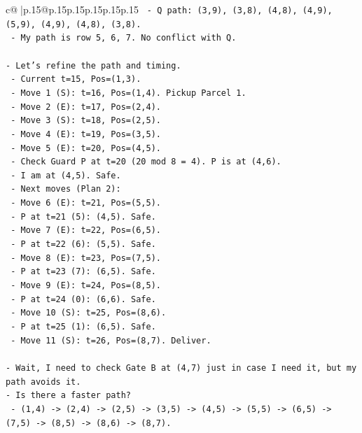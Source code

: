 \documentclass{article}
\begin{document}
{\begin{supertabular}{c@{$\;$}|p{.15\linewidth}@{}p{.15\linewidth}p{.15\linewidth}p{.15\linewidth}p{.15\linewidth}p{.15\linewidth}}
{{{\texttt{          {-} Q path: (3,9), (3,8), (4,8), (4,9), (5,9), (4,9), (4,8), (3,8).} \\
\texttt{          {-} My path is row 5, 6, 7. No conflict with Q.} \\
\\ 
\texttt{{-} Let's refine the path and timing.} \\
\texttt{  {-} Current t=15, Pos=(1,3).} \\
\texttt{  {-} Move 1 (S): t=16, Pos=(1,4). Pickup Parcel 1.} \\
\texttt{  {-} Move 2 (E): t=17, Pos=(2,4).} \\
\texttt{  {-} Move 3 (S): t=18, Pos=(2,5).} \\
\texttt{  {-} Move 4 (E): t=19, Pos=(3,5).} \\
\texttt{  {-} Move 5 (E): t=20, Pos=(4,5).} \\
\texttt{    {-} Check Guard P at t=20 (20 mod 8 = 4). P is at (4,6).} \\
\texttt{    {-} I am at (4,5). Safe.} \\
\texttt{  {-} Next moves (Plan 2):} \\
\texttt{    {-} Move 6 (E): t=21, Pos=(5,5).} \\
\texttt{      {-} P at t=21 (5): (4,5). Safe.} \\
\texttt{    {-} Move 7 (E): t=22, Pos=(6,5).} \\
\texttt{      {-} P at t=22 (6): (5,5). Safe.} \\
\texttt{    {-} Move 8 (E): t=23, Pos=(7,5).} \\
\texttt{      {-} P at t=23 (7): (6,5). Safe.} \\
\texttt{    {-} Move 9 (E): t=24, Pos=(8,5).} \\
\texttt{      {-} P at t=24 (0): (6,6). Safe.} \\
\texttt{    {-} Move 10 (S): t=25, Pos=(8,6).} \\
\texttt{      {-} P at t=25 (1): (6,5). Safe.} \\
\texttt{    {-} Move 11 (S): t=26, Pos=(8,7). Deliver.} \\
\\ 
\texttt{{-} Wait, I need to check Gate B at (4,7) just in case I need it, but my path avoids it.} \\
\texttt{{-} Is there a faster path?} \\
\texttt{  {-} (1,4) {-}> (2,4) {-}> (2,5) {-}> (3,5) {-}> (4,5) {-}> (5,5) {-}> (6,5) {-}> (7,5) {-}> (8,5) {-}> (8,6) {-}> (8,7).} \\
}}}
\end{supertabular}}
\end{document}

